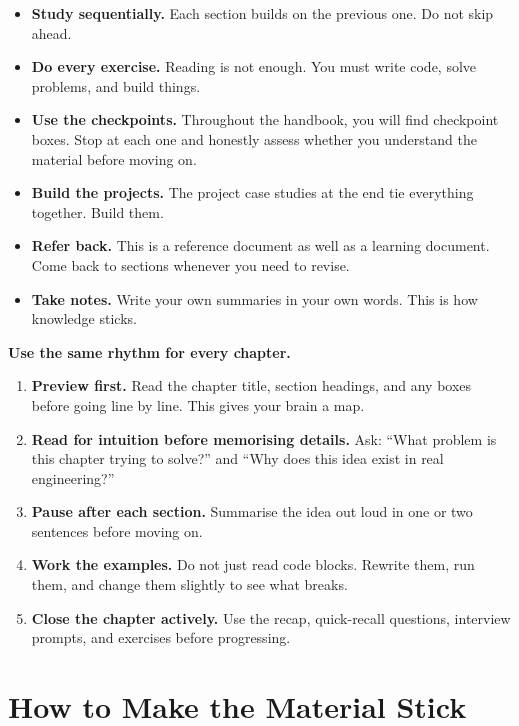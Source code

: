\documentclass[12pt, a4paper, oneside]{book}
\begin{document}
\begin{itemize}[leftmargin=2em]
    \item \textbf{Study sequentially.} Each section builds on the previous one. Do not skip ahead.
    \item \textbf{Do every exercise.} Reading is not enough. You must write code, solve problems, and build things.
    \item \textbf{Use the checkpoints.} Throughout the handbook, you will find checkpoint boxes. Stop at each one and honestly assess whether you understand the material before moving on.
    \item \textbf{Build the projects.} The project case studies at the end tie everything together. Build them.
    \item \textbf{Refer back.} This is a reference document as well as a learning document. Come back to sections whenever you need to revise.
    \item \textbf{Take notes.} Write your own summaries in your own words. This is how knowledge sticks.
\end{itemize}

\begin{studybox}
\textbf{Use the same rhythm for every chapter.}
\begin{enumerate}[leftmargin=2em]
    \item \textbf{Preview first.} Read the chapter title, section headings, and any boxes before going line by line. This gives your brain a map.
    \item \textbf{Read for intuition before memorising details.} Ask: ``What problem is this chapter trying to solve?'' and ``Why does this idea exist in real engineering?''
    \item \textbf{Pause after each section.} Summarise the idea out loud in one or two sentences before moving on.
    \item \textbf{Work the examples.} Do not just read code blocks. Rewrite them, run them, and change them slightly to see what breaks.
    \item \textbf{Close the chapter actively.} Use the recap, quick-recall questions, interview prompts, and exercises before progressing.
\end{enumerate}
\end{studybox}

\section*{How to Make the Material Stick}
\end{document}
